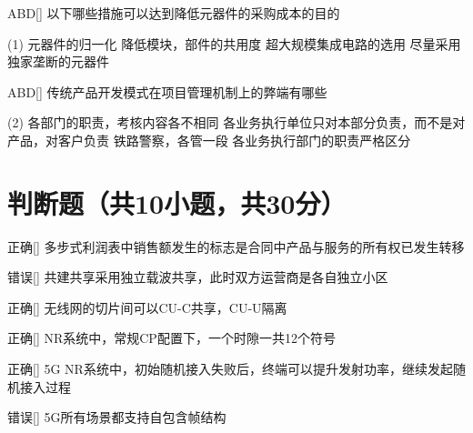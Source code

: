 \begin{choice}{\;ABD\;}[]
    以下哪些措施可以达到降低元器件的采购成本的目的
    \begin{tasks}(1)
        \task 元器件的归一化
        \task 降低模块，部件的共用度
        \task 超大规模集成电路的选用
        \task 尽量采用独家垄断的元器件
    \end{tasks}
\end{choice}

\begin{choice}{\;ABD\;}[]
    传统产品开发模式在项目管理机制上的弊端有哪些
    \begin{tasks}(2)
        \task 各部门的职责，考核内容各不相同
        \task 各业务执行单位只对本部分负责，而不是对产品，对客户负责
        \task 铁路警察，各管一段
        \task 各业务执行部门的职责严格区分
    \end{tasks}
\end{choice}




\section{判断题（共10小题，共30分）}

\begin{choice}{\;正确\;}[]
    多步式利润表中销售额发生的标志是合同中产品与服务的所有权已发生转移
\end{choice}


\begin{choice}{\;错误\;}[]
    共建共享采用独立载波共享，此时双方运营商是各自独立小区
\end{choice}

\begin{choice}{\;正确\;}[]
    无线网的切片间可以CU-C共享，CU-U隔离
\end{choice}

\begin{choice}{\;正确\;}[]
    NR系统中，常规CP配置下，一个时隙一共12个符号
\end{choice}

\begin{choice}{\;正确\;}[]
    5G NR系统中，初始随机接入失败后，终端可以提升发射功率，继续发起随机接入过程
\end{choice}

\begin{choice}{\;错误\;}[]
    5G所有场景都支持自包含帧结构

\end{choice}


